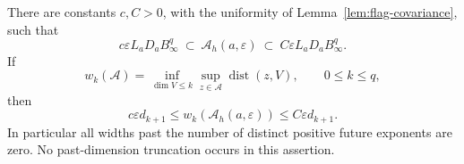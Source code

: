 \begin{proposition}
\label{prop:ambiguity-ellipsoid}
There are constants $c,C>0$, with the uniformity of
Lemma~\ref{lem:flag-covariance}, such that
\begin{equation}\label{eq:ambiguity-sandwich}
 c\varepsilon L_aD_aB_\infty^q
 \ \subset\ \mathcal A_h(a,\varepsilon)
 \ \subset\ C\varepsilon L_aD_aB_\infty^q.
\end{equation}
If
\[
 w_k(\mathcal A)=\inf_{\dim V\le k}\sup_{z\in\mathcal A}
                        \operatorname{dist}(z,V),\qquad 0\le k\le q,
\]
then
\begin{equation}\label{eq:ambiguity-widths}
 c\varepsilon d_{k+1}\le w_k(\mathcal A_h(a,\varepsilon))
                         \le C\varepsilon d_{k+1}.
\end{equation}
In particular all widths past the number of distinct positive future
exponents are zero. No past-dimension truncation occurs in this assertion.
\end{proposition}
